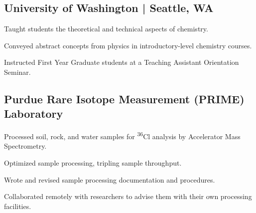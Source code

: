 \documentclass[letterpaper]{radler-resume-class}
\begin{document}
\begin{minipage}[t]{0.65\textwidth}
\subsection{University of Washington | Seattle, WA}
\begin{tightitemize}
\item Taught students the theoretical and technical aspects of chemistry.
\item Conveyed abstract concepts from physics in introductory-level chemistry courses.
\item Instructed First Year Graduate students at a Teaching Assistant Orientation Seminar.
\end{tightitemize}
\sectionspace
\subsection{Purdue Rare Isotope Measurement (PRIME) Laboratory}
\begin{tightitemize}
\item Processed soil, rock, and water samples for \textsuperscript{36}Cl analysis by Accelerator Mass Spectrometry.
\item Optimized sample processing, tripling sample throughput.
\item Wrote and revised sample processing documentation and procedures.
\item Collaborated remotely with researchers to advise them with their own processing facilities.
\end{tightitemize}



\end{minipage}
\end{document}

